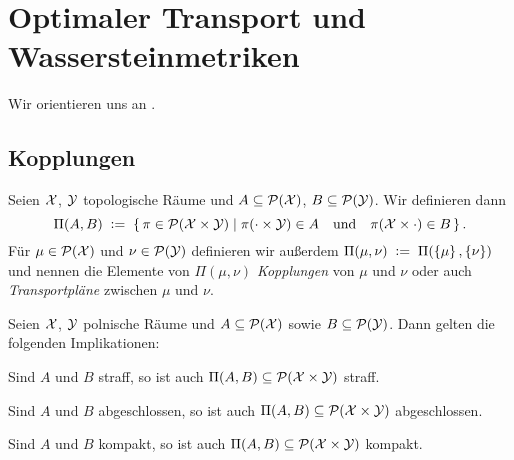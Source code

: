 \documentclass[../main/main.tex]{subfiles}
\begin{document}
	
	\section{Optimaler Transport und Wassersteinmetriken}
	
	Wir orientieren uns an \cite{Villani.2009}.
	
	\subsection{Kopplungen}
	
	\begin{Definition}[Kopplung]
		Seien $\mathcal{X}$, $\mathcal{Y}$ topologische Räume und $A \subseteq \mathcal{P}(\mathcal{X})$, $B \subseteq \mathcal{P}(\mathcal{Y})$. Wir definieren dann
		\[ \Pi(A, B) \; \vcentcolon = \; \left\{\, \pi \in \mathcal{P}(\mathcal{X} \times \mathcal{Y}) \; \middle| \; \pi(\cdot \times \mathcal{Y}) \in A \quad \text{und} \quad \pi(\mathcal{X} \times \cdot) \in B \,\right\} \text{.}\]
		Für $\mu \in \mathcal{P}(\mathcal{X})$ und $\nu \in \mathcal{P}(\mathcal{Y})$ definieren wir außerdem $\Pi(\mu, \nu) \; \vcentcolon = \; \Pi(\left\{\mu\right\}, \left\{\nu\right\})$ und nennen die
		Elemente von $\Pi(\mu, \nu)$ \emph{Kopplungen} von $\mu$ und $\nu$ oder auch \emph{Transportpläne} zwischen $\mu$ und $\nu$.
	\end{Definition}

	\begin{Hilfssatz}
		\label{lem:couplingsproperties}
		Seien $\mathcal{X}$, $\mathcal{Y}$ polnische Räume und $A \subseteq \mathcal{P}(\mathcal{X})$ sowie $B \subseteq \mathcal{P}(\mathcal{Y})$. Dann gelten die folgenden Implikationen:
		\begin{enumeratethm}
			\item Sind $A$ und $B$ straff, so ist auch $\Pi(A, B) \subseteq \mathcal{P}(\mathcal{X} \times \mathcal{Y})$ straff.
			\item Sind $A$ und $B$ abgeschlossen, so ist auch $\Pi(A, B) \subseteq \mathcal{P}(\mathcal{X} \times \mathcal{Y})$ abgeschlossen.
			\item Sind $A$ und $B$ kompakt, so ist auch $\Pi(A, B) \subseteq \mathcal{P}(\mathcal{X} \times \mathcal{Y})$ kompakt.
		\end{enumeratethm}
	\end{Hilfssatz}
\end{document}
